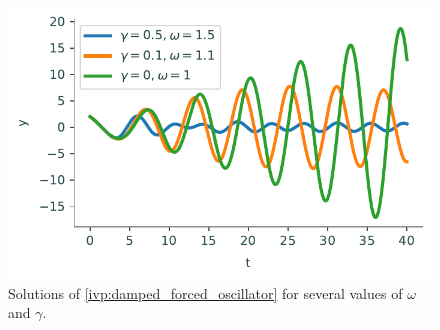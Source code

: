 \begin{figure}[H]
\centering
\includegraphics[width=\textwidth]{figures/damped_forced_oscillator.pdf}
\caption{Solutions of \eqref{ivp:damped_forced_oscillator} for several values of $\omega$ and $\gamma$.}
\label{ivp:damped_forced_oscillator_figure}
\end{figure}
